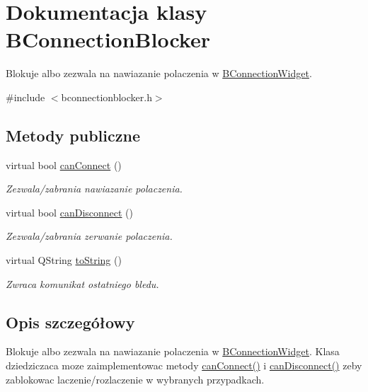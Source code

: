 \hypertarget{class_b_connection_blocker}{
\section{Dokumentacja klasy BConnectionBlocker}
\label{class_b_connection_blocker}
}


Blokuje albo zezwala na nawiazanie polaczenia w \hyperlink{class_b_connection_widget}{BConnectionWidget}.  


{\ttfamily \#include $<$bconnectionblocker.h$>$}\subsection*{Metody publiczne}
\begin{DoxyCompactItemize}
\item 
virtual bool \hyperlink{class_b_connection_blocker_a2ebcdef0e5570c7331036dd5b6ba4448}{canConnect} ()
\begin{DoxyCompactList}\small\item\em Zezwala/zabrania nawiazanie polaczenia. \item\end{DoxyCompactList}\item 
virtual bool \hyperlink{class_b_connection_blocker_a81e8782c93ac1943a7e19b4ed7ced792}{canDisconnect} ()
\begin{DoxyCompactList}\small\item\em Zezwala/zabrania zerwanie polaczenia. \item\end{DoxyCompactList}\item 
\hypertarget{class_b_connection_blocker_adbf0d87dd3869926916e7bd956fbbc11}{
virtual QString \hyperlink{class_b_connection_blocker_adbf0d87dd3869926916e7bd956fbbc11}{toString} ()}
\label{class_b_connection_blocker_adbf0d87dd3869926916e7bd956fbbc11}

\begin{DoxyCompactList}\small\item\em Zwraca komunikat ostatniego bledu. \item\end{DoxyCompactList}\end{DoxyCompactItemize}


\subsection{Opis szczegółowy}
Blokuje albo zezwala na nawiazanie polaczenia w \hyperlink{class_b_connection_widget}{BConnectionWidget}. Klasa dziedziczaca moze zaimplementowac metody \hyperlink{class_b_connection_blocker_a2ebcdef0e5570c7331036dd5b6ba4448}{canConnect()} i \hyperlink{class_b_connection_blocker_a81e8782c93ac1943a7e19b4ed7ced792}{canDisconnect()} zeby zablokowac laczenie/rozlaczenie w wybranych przypadkach.

